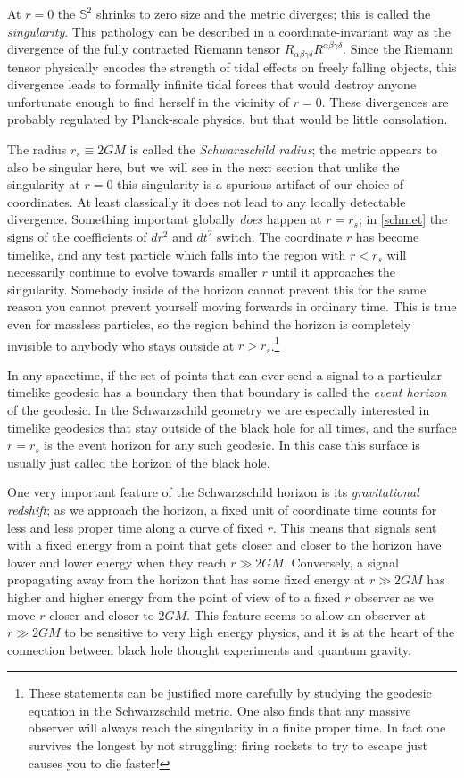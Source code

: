 \documentclass[12pt]{article}
\begin{document}
At $r=0$ the $\mathbb{S}^2$ shrinks to zero size and the metric diverges; this is called the \textit{singularity}.  This pathology can be described in a coordinate-invariant way as the divergence of the fully contracted Riemann tensor $R_{\alpha\beta\gamma \delta}R^{\alpha\beta\gamma\delta}$.  Since the Riemann tensor physically encodes the strength of tidal effects on freely falling objects, this divergence leads to formally infinite tidal forces that would destroy anyone unfortunate enough to find herself in the vicinity of $r=0$.  These divergences are probably regulated by Planck-scale physics, but that would be little consolation.   

The radius $r_s\equiv2GM$ is called the \textit{Schwarzschild radius}; the metric appears to also be singular here, but we will see in the next section that unlike the singularity at $r=0$ this singularity is a spurious artifact of our choice of coordinates. At least classically it does not lead to any locally detectable divergence.  Something important globally \textit{does} happen at $r=r_s$; in \eqref{schmet} the signs of the coefficients of $dr^2$ and $dt^2$ switch.  The coordinate $r$ has become timelike, and any test particle which falls into the region with $r<r_s$ will necessarily continue to evolve towards smaller $r$ until it approaches the singularity.  Somebody inside of the horizon cannot prevent this for the same reason you cannot prevent yourself moving forwards in ordinary time.  This is true even for massless particles, so the region behind the horizon is completely invisible to anybody who stays outside at $r>r_s$.\footnote{These statements can be justified more carefully by studying the geodesic equation in the Schwarzschild metric.  One also finds that any massive observer will always reach the singularity in a finite proper time.  In fact one survives the longest by not struggling; firing rockets to try to escape just causes you to die faster!}  

In any spacetime, if the set of points that can ever send a signal to a particular timelike geodesic has a boundary then that boundary is called the \textit{event horizon} of the geodesic.  In the Schwarzschild geometry we are especially interested in timelike geodesics that stay outside of the black hole for all times, and the surface $r=r_s$ is the event horizon for any such geodesic.  In this case this surface is usually just called the horizon of the black hole.

One very important feature of the Schwarzschild horizon is its \textit{gravitational redshift}; as we approach the horizon, a fixed unit of coordinate time counts for less and less proper time along a curve of fixed $r$.  This means that signals sent with a fixed energy from a point that gets closer and closer to the horizon have lower and lower energy when they reach $r\gg 2GM$.  Conversely, a signal propagating away from the horizon that has some fixed energy at $r\gg 2GM$ has higher and higher energy from the point of view of to a fixed $r$ observer as we move $r$ closer and closer to $2GM$.  This feature seems to allow an observer at $r\gg 2GM$ to be sensitive to very high energy physics, and it is at the heart of the connection between black hole thought experiments and quantum gravity.
\end{document}
